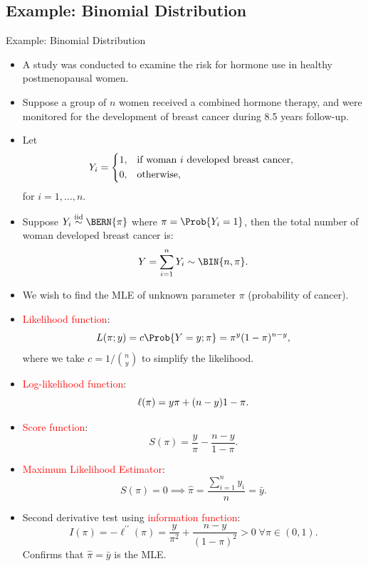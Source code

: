 \documentclass[oneside]{book}\usepackage[]{graphicx}\usepackage[svgnames]{xcolor}
\let\log\relax%
\newcommand{\iid}{\overset{\text{iid}}{\sim}}%
\begin{document}
\subsection*{Example: Binomial Distribution}
\begin{Example}{Example: Binomial Distribution}
      \begin{itemize}
            \item A study was conducted to examine the risk for hormone use in healthy
                  postmenopausal women.
            \item Suppose a group of $ n $ women received a combined hormone therapy, and were
                  monitored for the development of breast cancer during 8.5 years follow-up.
            \item Let
                  \[ Y_i=\begin{cases*}
                              1, & if woman $ i $ developed breast cancer, \\
                              0, & otherwise,
                        \end{cases*} \]
                  for $ i=1,\ldots,n $.
            \item Suppose $ Y_i \iid\BERN{\pi} $ where $ \pi=\Prob{Y_i=1} $, then the total number of woman developed breast cancer is:
                  \[ Y=\sum_{i=1}^{n} Y_i \sim \BIN{n,\pi}. \]
            \item We wish to find the MLE of unknown parameter $ \pi $ (probability of cancer).
      \end{itemize}
\end{Example}
\begin{itemize}
      \item \textcolor{Red}{Likelihood function}:
            \[ L(\pi;y)=c\Prob{Y=y;\pi}=\pi^y(1-\pi)^{n-y}, \]
            where we take $ c=1/\binom{n}{y} $ to simplify the likelihood.
      \item \textcolor{Red}{Log-likelihood function}:
            \[ \ell(\pi)=y\log{\pi}+(n-y)\log{1-\pi}. \]
      \item \textcolor{Red}{Score function}:
            \[ S(\pi)=\frac{y}{\pi}-\frac{n-y}{1-\pi}.  \]
      \item \textcolor{Red}{Maximum Likelihood Estimator}:
            \[ S(\pi)=0\implies \hat{\pi}=\frac{\sum_{i=1}^{n} y_i}{n}=\bar{y}. \]
      \item Second derivative test using \textcolor{Red}{information function}:
            \[ I(\pi)=-\ell^{\prime\prime}(\pi)=\frac{y}{\pi^2}+\frac{n-y}{(1-\pi)^2}>0\; \forall \pi\in(0,1). \]
            Confirms that $ \hat{\pi}=\bar{y} $ is the MLE\@.
\end{itemize}
\end{document}

